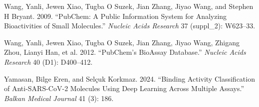 \begin{CSLReferences}{1}{0}
\leavevmode{}%
Wang, Yanli, Jewen Xiao, Tugba O Suzek, Jian Zhang, Jiyao Wang, and Stephen H Bryant. 2009. {``PubChem: A Public Information System for Analyzing Bioactivities of Small Molecules.''} \emph{Nucleic Acids Research} 37 (suppl\_2): W623--33.

\leavevmode{}%
Wang, Yanli, Jewen Xiao, Tugba O Suzek, Jian Zhang, Jiyao Wang, Zhigang Zhou, Lianyi Han, et al. 2012. {``PubChem's BioAssay Database.''} \emph{Nucleic Acids Research} 40 (D1): D400--412.

\leavevmode{}%
Yamasan, Bilge Eren, and Selçuk Korkmaz. 2024. {``Binding Activity Classification of Anti-SARS-CoV-2 Molecules Using Deep Learning Across Multiple Assays.''} \emph{Balkan Medical Journal} 41 (3): 186.

\end{CSLReferences}



\address{%
Selcuk Korkmaz\\
Trakya University\\%
Department Biostatistics\\ Edirne, Türkiye\\
%
%
\textit{ORCiD: \href{https://orcid.org/0000-0003-4632-6850}{0000-0003-4632-6850}}\\%
\href{mailto:selcukkorkmaz@trakya.edu.tr}{\nolinkurl{selcukkorkmaz@trakya.edu.tr}}%
}

\address{%
Bilge Eren Yamasan\\
Trakya University\\%
Department Biophysics\\ Edirne, Türkiye\\
%
%
\textit{ORCiD: \href{https://orcid.org/0000-0002-6525-2503}{0000-0002-6525-2503}}\\%
\href{mailto:berenyamasan@trakya.edu.tr}{\nolinkurl{berenyamasan@trakya.edu.tr}}%
}

\address{%
Dincer Goksuluk\\
Erciyes University\\%
Department Biostatistics\\ Kayseri, Türkiye\\
%
%
\textit{ORCiD: \href{https://orcid.org/0000-0002-2752-7668}{0000-0002-2752-7668}}\\%
\href{mailto:dincergoksuluk@erciyes.edu.tr}{\nolinkurl{dincergoksuluk@erciyes.edu.tr}}%
}
